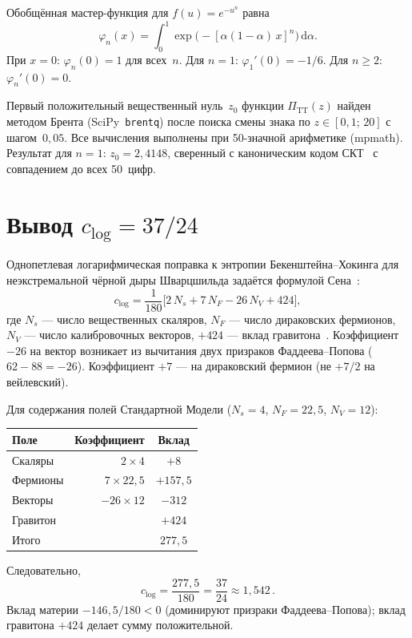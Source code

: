 \documentclass[12pt,a4paper]{article}
\theoremstyle{plain}
\theoremstyle{definition}
\theoremstyle{remark}
\newcommand{\dd}{\mathrm{d}}
\begin{document}
Обобщённая мастер-функция для $f(u) = e^{-u^n}$ равна
\begin{equation}\label{eq:phi-n-app}
  \varphi_n(x) = \int_0^1
  \exp\bigl(-[\alpha(1-\alpha)\, x]^n\bigr)\, \dd\alpha.
\end{equation}
При $x = 0$: $\varphi_n(0) = 1$ для всех~$n$. Для $n = 1$:
$\varphi_1'(0) = -1/6$. Для $n \geq 2$: $\varphi_n'(0) = 0$.

Первый положительный вещественный нуль~$z_0$ функции
$\Pi_{\mathrm{TT}}(z)$ найден методом Брента
(SciPy~\texttt{brentq}) после поиска смены знака по
$z \in [0{,}1;\, 20]$ с шагом~$0{,}05$. Все вычисления
выполнены при 50-значной арифметике (mpmath). Результат для $n = 1$:
$z_0 = 2{,}4148$, сверенный с каноническим кодом
СКТ~\cite{Alfyorov:2026repo} с совпадением до всех 50~цифр.

\section{Вывод $c_{\log} = 37/24$}
\label{app:clog}

Однопетлевая логарифмическая поправка к энтропии
Бекенштейна--Хокинга для неэкстремальной чёрной дыры
Шварцшильда задаётся формулой Сена~\cite{Sen:2012}:
\begin{equation}\label{eq:sen-formula}
  c_{\log} = \frac{1}{180}\bigl[
  2\,N_s + 7\,N_F - 26\,N_V + 424\bigr],
\end{equation}
где $N_s$ --- число вещественных скаляров, $N_F$ --- число
дираковских фермионов, $N_V$ --- число калибровочных векторов,
$+424$ --- вклад гравитона~\cite{Sen:2012}.
Коэффициент $-26$ на вектор возникает из вычитания двух
призраков Фаддеева--Попова ($62 - 88 = -26$). Коэффициент
$+7$ --- на дираковский фермион (не $+7/2$ на вейлевский).

Для содержания полей Стандартной Модели ($N_s = 4$,
$N_F = 22{,}5$, $N_V = 12$):
\begin{center}
\begin{tabular}{lrc}
\toprule
Поле & Коэффициент & Вклад \\
\midrule
Скаляры  & $2 \times 4$ & $+8$ \\
Фермионы & $7 \times 22{,}5$ & $+157{,}5$ \\
Векторы  & $-26 \times 12$ & $-312$ \\
Гравитон & & $+424$ \\
\midrule
Итого    & & $277{,}5$ \\
\bottomrule
\end{tabular}
\end{center}
Следовательно,
\begin{equation}\label{eq:clog-result}
  \boxed{c_{\log} = \frac{277{,}5}{180}
  = \frac{37}{24} \approx 1{,}542\,.}
\end{equation}
Вклад материи $-146{,}5/180 < 0$ (доминируют призраки
Фаддеева--Попова); вклад гравитона $+424$ делает сумму
положительной.
\end{document}
